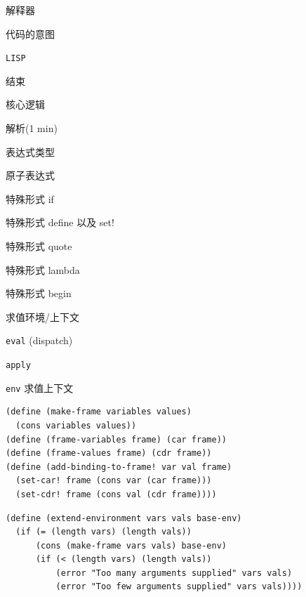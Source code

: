 \documentclass[presentation, bigger]{beamer}
\begin{document}
\begin{frame}[label={sec:org106539d},fragile]{解释器}
\begin{frame}[label={sec:org3020c49},fragile]{代码的意图}
\begin{frame}[label={sec:org3aa0441},fragile]{\texttt{LISP}}
\begin{frame}[label={sec:orgae54002}]{结束}
\begin{frame}[label={sec:orgdceac76}]{核心逻辑}
\begin{frame}[label={sec:org629dbc5},fragile]{解析(1 min)}
\begin{frame}[label={sec:org4dc3947}]{表达式类型}
\begin{frame}[label={sec:org0820679},fragile]{原子表达式}
\begin{frame}[label={sec:org7f2d161},fragile]{特殊形式 \alert{if}}
\begin{frame}[label={sec:org068cbf5},fragile]{特殊形式 \alert{define} 以及 \alert{set!}}
\begin{frame}[label={sec:org112cef9},fragile]{特殊形式 \alert{quote}}
\begin{frame}[label={sec:org11ad90e},fragile]{特殊形式 \alert{lambda}}
\begin{frame}[label={sec:org7715afb},fragile]{特殊形式 \alert{begin}}
\begin{frame}[label={sec:org620347b}]{求值环境/上下文}
\begin{frame}[label={sec:org54f6ddb},fragile]{\texttt{eval} (dispatch)}
\begin{frame}[label={sec:org1c939df},fragile]{\texttt{apply}}
\begin{frame}[fragile,allowframebreaks,label=]{\texttt{env} 求值上下文}
\begin{lstlisting}
(define (make-frame variables values)
  (cons variables values))
(define (frame-variables frame) (car frame))
(define (frame-values frame) (cdr frame))
(define (add-binding-to-frame! var val frame)
  (set-car! frame (cons var (car frame)))
  (set-cdr! frame (cons val (cdr frame))))
\end{lstlisting}

\framebreak
{}
\begin{lstlisting}
(define (extend-environment vars vals base-env)
  (if (= (length vars) (length vals))
      (cons (make-frame vars vals) base-env)
      (if (< (length vars) (length vals))
          (error "Too many arguments supplied" vars vals)
          (error "Too few arguments supplied" vars vals))))

\end{lstlisting}
\end{frame}


\end{frame}
\end{frame}
\end{frame}
\end{frame}
\end{frame}
\end{frame}
\end{frame}
\end{frame}
\end{frame}
\end{frame}
\end{frame}
\end{frame}
\end{frame}
\end{frame}
\end{frame}
\end{frame}
\end{document}
